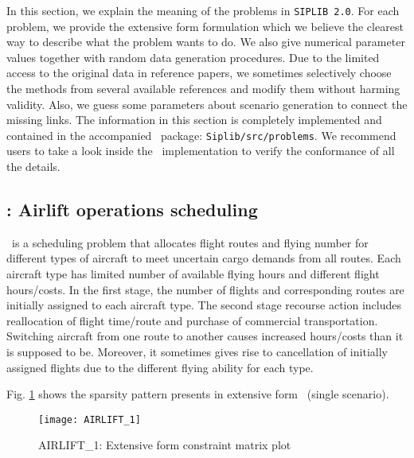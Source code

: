 In this section, we explain the meaning of the problems in \texttt{SIPLIB 2.0}. For each problem, we provide the extensive form formulation which we believe the clearest way to describe what the problem wants to do. We also give numerical parameter values together with random data generation procedures. Due to the limited access to the original data in reference papers, we sometimes selectively choose the methods from several available references and modify them without harming validity. Also, we guess some parameters about scenario generation to connect the missing links. The information in this section is completely implemented and contained in the accompanied \julia\ package: \texttt{Siplib/src/problems}. We recommend users to take a look inside the \julia\ implementation to verify the conformance of all the details.

\subsection{\airlift: Airlift operations scheduling} \label{AIRLIFT}
\airlift\ is a scheduling problem that allocates flight routes and flying number for different types of aircraft to meet uncertain cargo demands from all routes. Each aircraft type has limited number of available flying hours and different flight hours/costs. In the first stage, the number of flights and corresponding routes are initially assigned to each aircraft type. The second stage recourse action includes reallocation of flight time/route and purchase of commercial transportation. Switching aircraft from one route to another causes increased hours/costs than it is supposed to be. Moreover, it sometimes gives rise to cancellation of initially assigned flights due to the different flying ability for each type.    

Fig. \ref{fig:airlift_sparsity} shows the sparsity pattern presents in extensive form \airlift\ (single scenario).
\begin{figure}[H]
	\centering
	\texttt{[image: AIRLIFT\_1]}
	\caption{AIRLIFT\_1: Extensive form constraint matrix plot}
	\label{fig:airlift_sparsity}
\end{figure}
